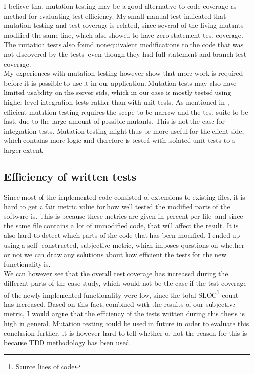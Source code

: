 I believe that mutation testing may be a good alternative to code
coverage as method for evaluating test efficiency. My small manual test
indicated that mutation testing and test coverage is related, since
several of the living mutants modified the same line, which also showed
to have zero statement test coverage. The mutation tests also found
nonequivalent modifications to the code that was not discovered by the
tests, even though they had full statement and branch test coverage.\\

My experiences with mutation testing however show that more work is
required before it is possible to use it in our application. Mutation
tests may also have limited usability on the server side, which in our
case is mostly tested using higher-level integration tests rather than
with unit tests. As mentioned in , efficient
mutation testing requires the scope to be narrow and the test suite to
be fast, due to the large amount of possible mutants. This is not the
case for integration tests. Mutation testing might thus be more
useful for the client-side, which contains more logic and therefore is
tested with isolated unit tests to a larger extent.\\


\subsection{Efficiency of written tests}

Since most of the implemented code consisted of extensions to existing
files, it is hard to get a fair metric value for how well tested the
modified parts of the software is. This is because these metrics are
given in percent per file, and since the same file contains a lot of
unmodified code, that will affect the result. It is also hard to detect
which parts of the code that has been modified. I ended up using a self-
constructed, subjective metric, which imposes questions on whether or
not we can draw any solutions about how efficient the tests for the new
functionality is.\\

We can however see that the overall test coverage has increased during
the different parts of the case study, which would not be the case if
the test coverage of the newly implemented functionality were low, since
the total SLOC\footnote{Source lines of code} count has increased. Based
on this fact, combined with the results of our subjective metric, I
would argue that the efficiency of the tests written during this thesis
is high in general. Mutation testing could be used in future in order to
evaluate this conclusion further. It is however hard to tell whether or
not the reason for this is because TDD methodology has been used.\\

